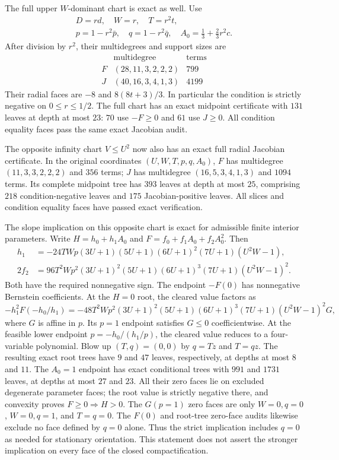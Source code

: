 \documentclass[11pt]{article}
\theoremstyle{remark}
\begin{document}
The full upper $W$-dominant chart is exact as well.  Use
\begin{gather*}
 D=rd,\quad W=r,\quad T=r^2t,\\
 p=1-r^2\bar p,\quad q=1-r^2\bar q,\quad
 A_0=\frac13+\frac23r^2c.
\end{gather*}
After division by $r^2$, their multidegrees and support sizes are
\[
\begin{array}{c|c|r}
 &\text{multidegree}&\text{terms}\\\hline
 F&(28,11,3,2,2,2)&799\\
 J&(40,16,3,4,1,3)&4199
\end{array}
\]
Their radial faces are $-8$ and $8(8t+3)/3$.  In particular the condition
is strictly negative on $0\leq r\leq1/2$.  The full chart has an exact
midpoint certificate with $131$ leaves at depth at most $23$: $70$ use
$-F\geq0$ and $61$ use $J\geq0$.  All condition equality faces pass the
same exact Jacobian audit.

The opposite infinity chart $V\leq U^2$ now also has an exact full radial
Jacobian certificate.  In the original coordinates $(U,W,T,p,q,A_0)$,
$F$ has multidegree $(11,3,3,2,2,2)$ and $356$ terms; $J$ has multidegree
$(16,5,3,4,1,3)$ and $1094$ terms.  Its complete midpoint tree has $393$
leaves at depth at most $25$, comprising $218$ condition-negative leaves
and $175$ Jacobian-positive leaves.  All slices and condition equality
faces have passed exact verification.

The slope implication on this opposite chart is exact for admissible
finite interior parameters.  Write $H=h_0+h_1A_0$ and
$F=f_0+f_1A_0+f_2A_0^2$.  Then
\[
\begin{split}
h_1&=-24TWp(3U+1)(5U+1)(6U+1)^2(7U+1)(U^2W-1),\\
2f_2&=96T^2Wp^2(3U+1)^2(5U+1)(6U+1)^3(7U+1)(U^2W-1)^2.
\end{split}
\]
Both have the required nonnegative sign.  The endpoint $-F(0)$ has
nonnegative Bernstein coefficients.  At the $H=0$ root, the cleared
value factors as
\[
-h_1^2F(-h_0/h_1)
=-48T^2Wp^2(3U+1)^2(5U+1)(6U+1)^3(7U+1)(U^2W-1)^2G,
\]
where $G$ is affine in $p$.  Its $p=1$ endpoint satisfies $G\leq0$
coefficientwise.  At the feasible lower endpoint $p=-h_0/(h_1/p)$,
the cleared value reduces to a four-variable polynomial.  Blow up
$(T,q)=(0,0)$ by $q=Tz$ and $T=qz$.  The resulting exact root trees
have $9$ and $47$ leaves, respectively, at depths at most $8$ and $11$.
The $A_0=1$ endpoint has exact conditional trees with $991$ and $1731$
leaves, at depths at most $27$ and $23$.  All their zero faces lie on
excluded degenerate parameter faces; the root value is strictly negative there, and convexity proves
$F\geq0\Rightarrow H>0$. The $G(p=1)$ zero faces are only
$W=0,q=0$, $W=0,q=1$, and $T=q=0$. The $F(0)$ and root-tree
zero-face audits likewise exclude no face defined by $q=0$ alone.
Thus the strict implication includes $q=0$ as needed for stationary
orientation.  This
statement does not assert the stronger implication on every face of the
closed compactification.
\end{document}
